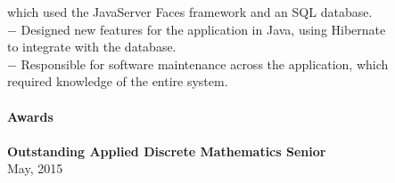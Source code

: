 \begin{center}
\begin{tabbing}
	\> \> \> \> which used the JavaServer Faces framework and an SQL database. \\
	\> \> \> $-$ Designed new features for the application in Java, using Hibernate \\
	\> \> \> \> to integrate with the database. \\
	\> \> \> $-$ Responsible for software maintenance across the application, which \\
	\> \> \> \> required knowledge of the entire system.\\
	\> \\
	\textbf{{Awards}}    \\ \\
	\> \textbf{Outstanding Applied Discrete Mathematics Senior} \\
	\> May, 2015 \\
\end{tabbing}
\end{center}